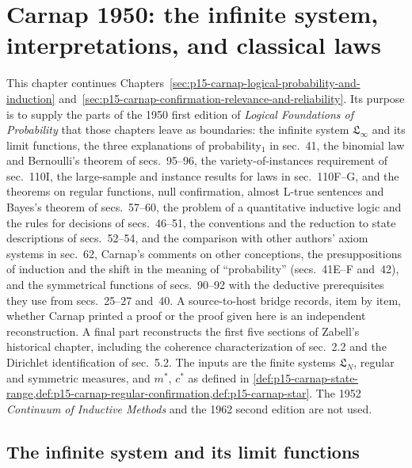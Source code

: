 \chapter{Carnap 1950: the infinite system, interpretations, and classical laws}
\label{sec:p15-w02b-p15-029}

This chapter continues
Chapters~\ref{sec:p15-carnap-logical-probability-and-induction}
and~\ref{sec:p15-carnap-confirmation-relevance-and-reliability}. Its
purpose is to supply the parts of the 1950 first edition of
\emph{Logical Foundations of Probability} that those chapters leave as
boundaries: the infinite system \(\mathfrak L_\infty\) and its limit
functions, the three explanations of probability\(_1\) in sec.~41, the
binomial law and Bernoulli's theorem of secs.~95--96, the
variety-of-instances requirement of sec.~110I, the large-sample and
instance results for laws in sec.~110F--G, and the theorems on regular
functions, null confirmation, almost L-true sentences and Bayes's
theorem of secs.~57--60, the problem of a quantitative inductive logic
and the rules for decisions of secs.~46--51, the conventions and the
reduction to state descriptions of secs.~52--54, and the comparison
with other authors' axiom systems in sec.~62, Carnap's comments on
other conceptions, the presuppositions of induction and the shift in
the meaning of ``probability'' (secs.~41E--F and~42), and the
symmetrical functions of secs.~90--92 with the deductive prerequisites
they use from secs.~25--27 and~40. A source-to-host bridge
records, item by item, whether Carnap printed a proof or the proof given
here is an independent reconstruction. A final part reconstructs the
first five sections of Zabell's historical chapter, including the
coherence characterization of sec.~2.2 and the Dirichlet
identification of sec.~5.2. The inputs are the
finite systems \(\mathfrak L_N\), regular and symmetric measures,
and \(m^*\), \(c^*\) as defined in
\cref{def:p15-carnap-state-range,def:p15-carnap-regular-confirmation,def:p15-carnap-star}.
The 1952 \emph{Continuum of Inductive Methods} and the 1962 second
edition are not used.

\section{The infinite system and its limit functions}
\label{sec:p15-w02b-p15-029-infinite}

